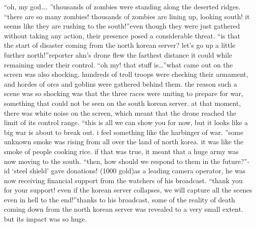 “oh, my god….
”thousands of zombies were standing along the deserted ridges.
“there are so many zombies! thousands of zombies are lining up, looking south! it seems like they are rushing to the south!”even though they were just gathered without taking any action, their presence posed a considerable threat.
“is that the start of disaster coming from the north korean server? let’s go up a little further north!”reporter ahn’s drone flew the farthest distance it could while remaining under their control.
“oh my! that stuff is…”what came out on the screen was also shocking.
 hundreds of troll troops were checking their armament, and hordes of orcs and goblins were gathered behind them.
the reason such a scene was so shocking was that the three races were uniting to prepare for war, something that could not be seen on the south korean server.
at that moment, there was white noise on the screen, which meant that the drone reached the limit of its control range.
“this is all we can show you for now, but it looks like a big war is about to break out.
 i feel something like the harbinger of war.
”some unknown smoke was rising from all over the land of north korea.
 it was like the smoke of people cooking rice.
 if that was true, it meant that a huge army was now moving to the south.
“then, how should we respond to them in the future?”-id ‘steel shield’ gave donations! (1000 gold)as a leading camera operator, he was now receiving financial support from the watchers of his broadcast.
“thank you for your support! even if the korean server collapses, we will capture all the scenes even in hell to the end!”thanks to his broadcast, some of the reality of death coming down from the north korean server was revealed to a very small extent.
but its impact was so huge.


 